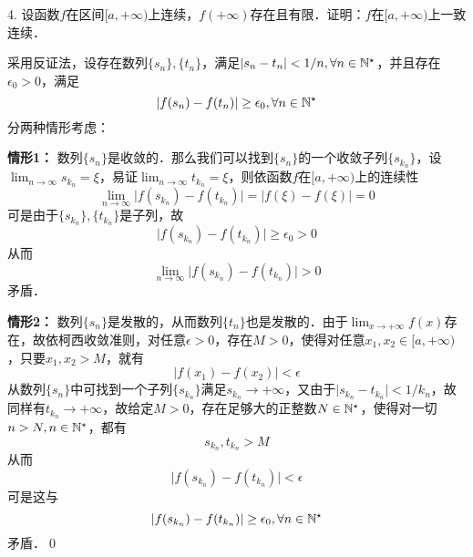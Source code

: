 4. 设函数$f$在区间$[a, +\infty)$上连续，$f(+\infty)$存在且有限．证明：$f$在$[a, +\infty)$上一致连续．

\prove 采用反证法，设存在数列$\{ s_n \}, \{ t_n \}$，满足$\lvert s_n - t_n \rvert < 1/n, \forall n \in \mathbb{N}^\star$，并且存在$\epsilon_0 > 0$，满足
\begin{equation}
    \lvert f(s_n) - f(t_n) \rvert \geq \epsilon_0, \forall n \in \mathbb{N}^\star
\end{equation}
分两种情形考虑：

\textbf{情形1：} 数列$\{ s_n \}$是收敛的．那么我们可以找到$\{ s_n \}$的一个收敛子列$\{ s_{k_n} \}$，设$\displaystyle\lim_{n \to \infty} s_{k_n} = \xi$，易证$\displaystyle\lim_{n \to \infty} t_{k_n} = \xi$，则依函数$f$在$[a,+\infty)$上的连续性
\begin{equation}
    \lim_{n \to \infty} \lvert f(s_{k_n}) - f(t_{k_n}) \rvert = \lvert f(\xi) - f(\xi) \rvert = 0
\end{equation}
可是由于$\{s_{k_n}\}, \{t_{k_n}\}$是子列，故
\begin{equation}
    \lvert f(s_{k_n}) - f(t_{k_n}) \rvert \geq \epsilon_0 > 0
\end{equation}
从而
\begin{equation}
    \lim_{n \to \infty} \lvert f(s_{k_n}) - f(t_{k_n}) \rvert > 0
\end{equation}
矛盾．

\textbf{情形2：} 数列$\{ s_n \}$是发散的，从而数列$\{ t_n \}$也是发散的．由于$\displaystyle\lim_{x \to +\infty} f(x)$存在，故依柯西收敛准则，对任意$\epsilon > 0$，存在$M > 0$，使得对任意$x_1, x_2 \in [a, +\infty)$，只要$x_1, x_2 > M$，就有
\begin{equation}
    \lvert f(x_1) - f(x_2) \rvert < \epsilon
\end{equation}
从数列$\{ s_n \}$中可找到一个子列$\{ s_{k_n}\}$满足$s_{k_n} \to +\infty$，又由于$\lvert s_{k_n} - t_{k_n} \rvert < 1/k_n$，故同样有$t_{k_n} \to +\infty$，故给定$M > 0$，存在足够大的正整数$N \in \mathbb{N}^\star$，使得对一切$n > N, n \in \mathbb{N}^\star$，都有
\begin{equation}
    s_{k_n}, t_{k_n} > M
\end{equation}
从而
\begin{equation}
    \lvert f(s_{k_n}) - f(t_{k_n}) \rvert < \epsilon
\end{equation}
可是这与
\begin{equation}
    \lvert f(s_{k_n}) - f(t_{k_n}) \rvert \geq \epsilon_0, \forall n \in \mathbb{N}^\star
\end{equation}
矛盾．\qed\bigskip